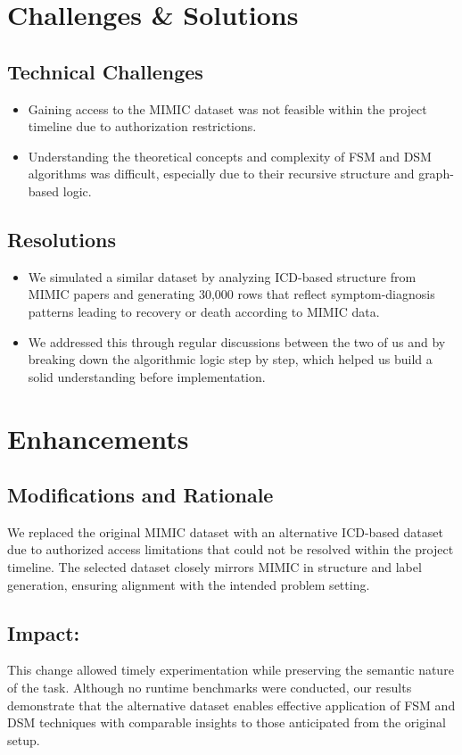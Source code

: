 \documentclass[10pt]{article}
\begin{document}
\section{Challenges \& Solutions}
\subsection*{Technical Challenges}
\begin{itemize}[noitemsep]
    \item Gaining access to the MIMIC dataset was not feasible within the project timeline due to authorization restrictions.
    \item Understanding the theoretical concepts and complexity of FSM and DSM algorithms was difficult, especially due to their recursive structure and graph-based logic.
\end{itemize}
\subsection*{Resolutions}
\begin{itemize}[noitemsep]
    \item We simulated a similar dataset by analyzing ICD-based structure from MIMIC papers and generating 30,000 rows that reflect symptom-diagnosis patterns leading to recovery or death according to MIMIC data.
    \item We addressed this through regular discussions between the two of us and by breaking down the algorithmic logic step by step, which helped us build a solid understanding before implementation.

\end{itemize}

\section{Enhancements}
\subsection*{Modifications and Rationale}
We replaced the original MIMIC dataset with an alternative ICD-based dataset due to authorized access limitations that could not be resolved within the project timeline. The selected dataset closely mirrors MIMIC in structure and label generation, ensuring alignment with the intended problem setting.
\subsection*{Impact:} 
This change allowed timely experimentation while preserving the semantic nature of the task. Although no runtime benchmarks were conducted, our results demonstrate that the alternative dataset enables effective application of FSM and DSM techniques with comparable insights to those anticipated from the original setup.
\end{document}
